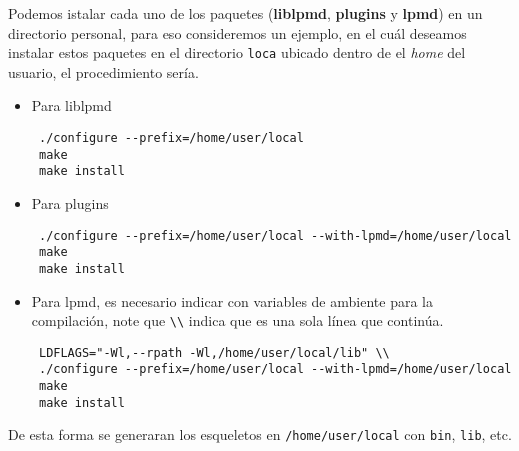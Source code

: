 \documentclass[a4paper,10pt]{scrbook}
\newcommand{\lpmd}{\textbf{lpmd }}
\begin{document}
Podemos istalar cada uno de los paquetes (\textbf{liblpmd}, \textbf{plugins} y \textbf{lpmd}) en un directorio personal, para eso consideremos un ejemplo, en el cu\'al deseamos instalar estos paquetes en el directorio \verb|loca| ubicado dentro de el \textit{home} del usuario, el procedimiento ser\'ia.

\begin{itemize}
 \item Para liblpmd
 \begin{verbatim}
 ./configure --prefix=/home/user/local
 make
 make install
 \end{verbatim}
 \item Para plugins
 \begin{verbatim}
 ./configure --prefix=/home/user/local --with-lpmd=/home/user/local
 make
 make install
 \end{verbatim}
 \item Para lpmd, es necesario indicar con variables de ambiente para la compilaci\'on, note que \verb|\\| indica que es una sola l\'inea que contin\'ua.
 \begin{verbatim}
 LDFLAGS="-Wl,--rpath -Wl,/home/user/local/lib" \\
 ./configure --prefix=/home/user/local --with-lpmd=/home/user/local
 make
 make install
 \end{verbatim}
\end{itemize}

De esta forma se generaran los esqueletos en \verb|/home/user/local| con \verb|bin|, \verb|lib|, etc.



% 
% 
\end{document}
